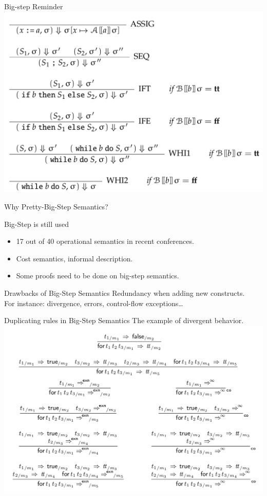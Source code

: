 \documentclass[page number,dvipsnames]{beamer}
\begin{document}
\begin{frame}{Big-step Reminder}
  \center
  \includegraphics[scale=0.2]{bigstep.png}
\end{frame}


\begin{frame}{Why Pretty-Big-Step Semantics?}
  \begin{block}{Big-Step is still used}
    \begin{itemize}
    \item 17 out of 40 operational semantics in recent conferences.
    \item Cost semantics, informal description.
    \item Some proofs need to be done on big-step semantics.
    \end{itemize}
  \end{block}
  \vfill
  \begin{alertblock}{Drawbacks of Big-Step Semantics}
    Redundancy when adding new constructs.\\
    For instance: divergence, errors, control-flow exceptions\dots
  \end{alertblock}
\end{frame}

\begin{frame}{Duplicating rules in Big-Step Semantics}
  The example of divergent behavior.\\
  \center
  \includegraphics[scale=0.25]{duplicates.png}
  
\end{frame}
\end{document}
